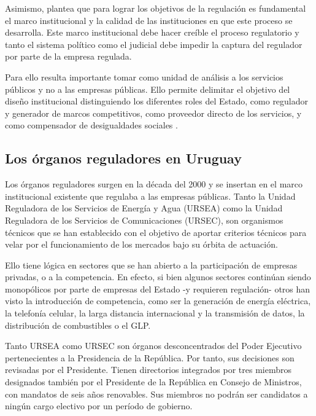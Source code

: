 \documentclass[
  12pt,
  spanish,
]{book}
\begin{document}
Asimismo, plantea que para lograr los objetivos de la regulación es fundamental el marco institucional y la calidad de las instituciones en que este proceso se desarrolla. Este marco institucional debe hacer creíble el proceso regulatorio y tanto el sistema político como el judicial debe impedir la captura del regulador por parte de la empresa regulada.

Para ello resulta importante tomar como unidad de análisis a los servicios públicos y no a las empresas públicas. Ello permite delimitar el objetivo del diseño institucional distinguiendo los diferentes roles del Estado, como regulador y generador de marcos competitivos, como proveedor directo de los servicios, y como compensador de desigualdades sociales \citep{Bergara2001}.

\hypertarget{los-uxf3rganos-reguladores-en-uruguay}{%
\subsection{Los órganos reguladores en Uruguay}\label{los-uxf3rganos-reguladores-en-uruguay}}

Los órganos reguladores surgen en la década del 2000 y se insertan en el marco institucional existente que regulaba a las empresas públicas. Tanto la Unidad Reguladora de los Servicios de Energía y Agua (URSEA) como la Unidad Reguladora de los Servicios de Comunicaciones (URSEC), son organismos técnicos que se han establecido con el objetivo de aportar criterios técnicos para velar por el funcionamiento de los mercados bajo su órbita de actuación.

Ello tiene lógica en sectores que se han abierto a la participación de empresas privadas, o a la competencia. En efecto, si bien algunos sectores continúan siendo monopólicos por parte de empresas del Estado -y requieren regulación- otros han visto la introducción de competencia, como ser la generación de energía eléctrica, la telefonía celular, la larga distancia internacional y la transmisión de datos, la distribución de combustibles o el GLP.

Tanto URSEA como URSEC son órganos desconcentrados del Poder Ejecutivo pertenecientes a la Presidencia de la República. Por tanto, sus decisiones son revisadas por el Presidente. Tienen directorios integrados por tres miembros designados también por el Presidente de la República en Consejo de Ministros, con mandatos de seis años renovables. Sus miembros no podrán ser candidatos a ningún cargo electivo por un período de gobierno.
\end{document}
